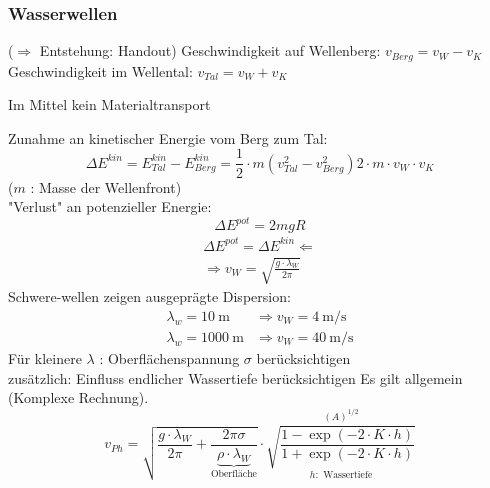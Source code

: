 \subsubsection{Wasserwellen}
\enter
($ \Rightarrow $ Entstehung: Handout)
\bild
Geschwindigkeit auf Wellenberg: $ v_{Berg} = v_W - v_K$\\
Geschwindigkeit im Wellental: $ v_{Tal} = v_{W} + v_{K} $\\
\begin{tcolorbox}[width=\textwidth*3/5,colback={White}]
Im Mittel kein Materialtransport
\end{tcolorbox}
Zunahme an kinetischer Energie vom Berg zum Tal:
$$ \Delta E^{kin} = E_{Tal}^{kin} - E_{Berg}^{kin} = \frac{1}{2} \cdot m (v_{Tal}^2 - v_{Berg}^2) 2 \cdot m \cdot v_{W} \cdot v_{K}$$
($ m $ : Masse der Wellenfront)\\
"Verlust" an potenzieller Energie:
$$ \Delta E ^{pot} = 2mgR $$
\begin{align*}
\Delta E^{pot}  = \Delta E ^{kin} \Leftarrow\\
\Rightarrow v_W = \sqrt{\frac{g\cdot\lambda_W}{2\pi}}
\end{align*}
Schwere-wellen zeigen ausgeprägte Dispersion:
\begin{align*}
\lambda_w = \SI{10}{\meter} &\Rightarrow v_W = \SI{4}{\meter\per\second}\\
\lambda_w = \SI{1000}{\meter} &\Rightarrow v_W = \SI{40}{\meter\per\second}
\end{align*}
Für kleinere $ \lambda $ : Oberflächenspannung $ \sigma $ berücksichtigen\\
zusätzlich: Einfluss endlicher Wassertiefe berücksichtigen
\bild
Es gilt allgemein (Komplexe Rechnung).\\
$$ v_{Ph} = \sqrt{\frac{g\cdot\lambda_W}{2\pi}+\frac{2\pi\sigma}{\underbrace{\rho\cdot\lambda_W}_{\text{Oberfläche}}}} \cdot \overset{(A)^{1/2}}{\underset{h: \text{ Wassertiefe}}{\sqrt{\frac{1-\exp(-2\cdot K \cdot h)}{1+\exp(-2 \cdot K \cdot h)}}}}$$

